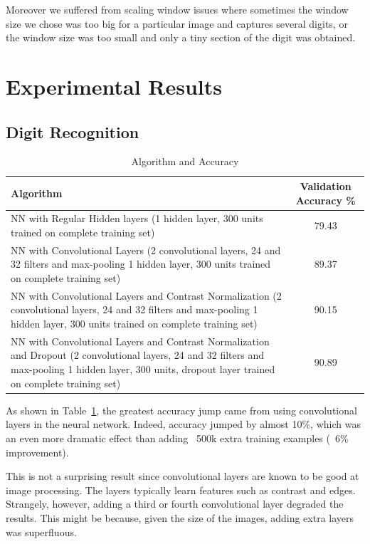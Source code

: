\documentclass{article} %
\begin{document}
Moreover we suffered from scaling window issues where sometimes the window size we chose was too big for a
particular image and captures several digits, or the window size was too small and only a tiny section of the digit was obtained.

\section{Experimental Results}
\subsection{Digit Recognition}

\begin{center}
\begin{table}[h]
  \begin{tabular}{ | p{10cm} || c ||}
    \hline
    Algorithm & Validation Accuracy \% \\ \hline \hline
    NN with Regular Hidden layers (1 hidden layer, 300 units
trained on complete training set) & 79.43 \\ \hline
NN with Convolutional Layers
(2 convolutional layers, 24 and 32 filters and max-pooling
1 hidden layer, 300 units
trained on complete training set) & 89.37 \\ \hline
NN with Convolutional Layers and Contrast Normalization
(2 convolutional layers, 24 and 32 filters and max-pooling
1 hidden layer, 300 units
trained on complete training set) & 90.15 \\ \hline
NN with Convolutional Layers and Contrast Normalization and Dropout
(2 convolutional layers, 24 and 32 filters and max-pooling
1 hidden layer, 300 units, dropout layer
trained on complete training set) & 90.89 \\ \hline
  \end{tabular}

\caption{Algorithm and Accuracy}
\label{table:algo}
\end{table}
\end{center}

As shown in Table~\ref{table:algo}, the greatest accuracy jump came from using convolutional layers in the neural network. Indeed, accuracy jumped by almost 10\%, which was an even more dramatic effect than adding ~500k extra training examples (~6\% improvement).

This is not a surprising result since convolutional layers are known to be good at image processing. The layers typically learn features such as contrast and edges. Strangely, however, adding a third or fourth convolutional layer degraded the results. This might be because, given the size of the images, adding extra layers was superfluous.
\end{document}
